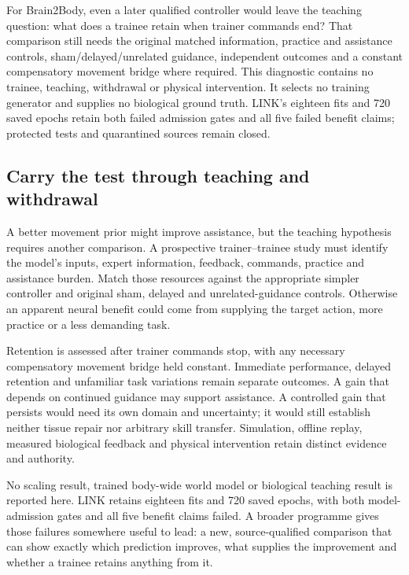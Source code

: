 For Brain2Body, even a later qualified controller would leave the teaching question: what does a trainee retain when trainer commands end? That comparison still needs the original matched information, practice and assistance controls, sham/delayed/unrelated guidance, independent outcomes and a constant compensatory movement bridge where required. This diagnostic contains no trainee, teaching, withdrawal or physical intervention. It selects no training generator and supplies no biological ground truth. LINK's eighteen fits and 720 saved epochs retain both failed admission gates and all five failed benefit claims; protected tests and quarantined sources remain closed.

\subsection{Carry the test through teaching and withdrawal}

A better movement prior might improve assistance, but the teaching hypothesis requires another comparison. A prospective trainer--trainee study must identify the model's inputs, expert information, feedback, commands, practice and assistance burden. Match those resources against the appropriate simpler controller and original sham, delayed and unrelated-guidance controls. Otherwise an apparent neural benefit could come from supplying the target action, more practice or a less demanding task.

Retention is assessed after trainer commands stop, with any necessary compensatory movement bridge held constant. Immediate performance, delayed retention and unfamiliar task variations remain separate outcomes. A gain that depends on continued guidance may support assistance. A controlled gain that persists would need its own domain and uncertainty; it would still establish neither tissue repair nor arbitrary skill transfer. Simulation, offline replay, measured biological feedback and physical intervention retain distinct evidence and authority.

No scaling result, trained body-wide world model or biological teaching result is reported here. LINK retains eighteen fits and 720 saved epochs, with both model-admission gates and all five benefit claims failed. A broader programme gives those failures somewhere useful to lead: a new, source-qualified comparison that can show exactly which prediction improves, what supplies the improvement and whether a trainee retains anything from it.
